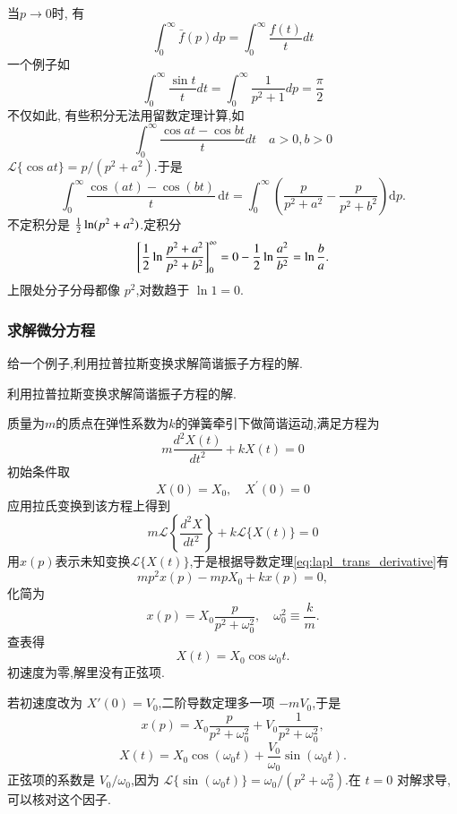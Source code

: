 当$p\to 0$时, 有
\begin{equation}
    \int_0^{\infty} \bar{f}(p) d p=\int_0^{\infty} \frac{f(t)}{t} d t
\end{equation}
一个例子如
$$
\int_0^{\infty} \frac{\sin t}{t} d t=\int_0^{\infty} \frac{1}{p^2+1} d p=\frac{\pi}{2}
$$
不仅如此, 有些积分无法用留数定理计算,如
$$
\int_0^{\infty} \frac{\cos a t-\cos b t}{t} d t \quad a>0, b>0
$$
$\mathcal{L}\{\cos at\}=p/(p^2+a^2)$.于是
\begin{equation}
  \int_0^{\infty}\frac{\cos(at)-\cos(bt)}{t}\,\mathrm{d}t
  = \int_0^{\infty}\left(\frac{p}{p^2+a^2}-\frac{p}{p^2+b^2}\right)\mathrm{d}p.
\end{equation}
不定积分是 ${\frac{1}{2}}\ln(p^2+a^2)$.定积分
\begin{equation}
  \left[{\frac{1}{2}}\ln\frac{p^2+a^2}{p^2+b^2}\right]_0^{\infty}
  = 0 - {\frac{1}{2}}\ln\frac{a^2}{b^2}
  = \ln\frac{b}{a}.
\end{equation}
上限处分子分母都像 $p^2$,对数趋于 $\ln 1=0$.

\subsubsection{求解微分方程}
给一个例子,利用拉普拉斯变换求解简谐振子方程的解.
\begin{example}
利用拉普拉斯变换求解简谐振子方程的解.
\end{example}
\begin{solution}
    质量为$m$的质点在弹性系数为$k$的弹簧牵引下做简谐运动,满足方程为
    $$
m \frac{d^2 X(t)}{d t^2}+k X(t)=0
$$
初始条件取
$$
X(0)=X_0, \quad X^{\prime}(0)=0
$$
应用拉氏变换到该方程上得到
$$
m \mathcal{L}\left\{\frac{d^2 X}{d t^2}\right\}+k \mathcal{L}\{X(t)\}=0
$$
用$x(p)$表示未知变换$\mathcal{L}\{ X(t)\}$,于是根据导数定理\eqref{eq:lapl_trans_derivative}有
$$
m p^2 x(p)-m p X_0+k x(p)=0,
$$
化简为
$$
x(p)=X_0 \frac{p}{p^2+\omega_0^2}, \quad \omega_0^2 \equiv \frac{k}{m} .
$$
查表得
$$
X(t)=X_0 \cos \omega_0 t.
$$
初速度为零,解里没有正弦项.
\end{solution}

若初速度改为 $X'(0)=V_0$,二阶导数定理多一项 $-m V_0$,于是
\begin{equation}
    x(p)=X_0\frac{p}{p^2+\omega_0^2}+V_0\frac{1}{p^2+\omega_0^2},
\end{equation}
\begin{equation}
    X(t)=X_0\cos(\omega_0 t)+\frac{V_0}{\omega_0}\sin(\omega_0 t).
\end{equation}
正弦项的系数是 $V_0/\omega_0$,因为 $\mathcal{L}\{\sin(\omega_0 t)\}=\omega_0/(p^2+\omega_0^2)$.在 $t=0$ 对解求导,可以核对这个因子.
